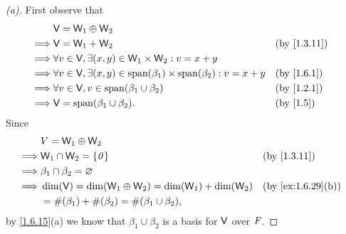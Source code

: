 \begin{proof}[(a)]
  First observe that
  \begin{align*}
             & \V = \W_1 \oplus \W_2                                                                                              \\
    \implies & \V = \W_1 + \W_2                                                                    &  & \text{(by \cref{1.3.11})} \\
    \implies & \forall v \in \V, \exists (x, y) \in \W_1 \times \W_2 : v = x + y                                                  \\
    \implies & \forall v \in \V, \exists (x, y) \in \spn{\beta_1} \times \spn{\beta_2} : v = x + y &  & \text{(by \cref{1.6.1})}  \\
    \implies & \forall v \in \V, v \in \spn{\beta_1 \cup \beta_2}                                  &  & \text{(by \cref{1.2.1})}  \\
    \implies & \V = \spn{\beta_1 \cup \beta_2}.                                                    &  & \text{(by \cref{1.5})}
  \end{align*}
  Since
  \begin{align*}
             & V = \W_1 \oplus \W_2                                                                             \\
    \implies & \W_1 \cap \W_2 = \set{\zv}                                  &  & \text{(by \cref{1.3.11})}       \\
    \implies & \beta_1 \cap \beta_2 = \varnothing                                                               \\
    \implies & \dim(\V) = \dim(\W_1 \oplus \W_2) = \dim(\W_1) + \dim(\W_2) &  & \text{(by \cref{ex:1.6.29}(b))} \\
             & = \#(\beta_1) + \#(\beta_2) = \#(\beta_1 \cup \beta_2),
  \end{align*}
  by \cref{1.6.15}(a) we know that \(\beta_1 \cup \beta_2\) is a basis for \(\mathsf{V}\) over \(\mathit{F}\).
\end{proof}

